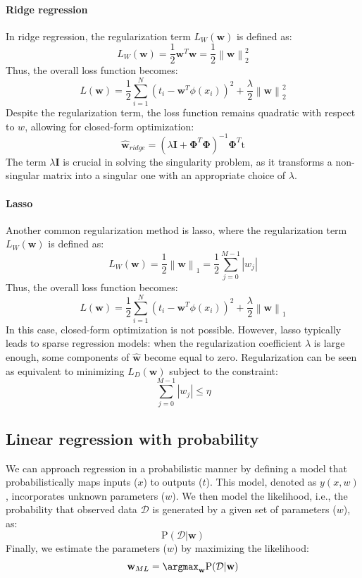 \paragraph*{Ridge regression}
In ridge regression, the regularization term $L_W(\textbf{w})$ is defined as:
\[L_W(\textbf{w})=\dfrac{1}{2}\textbf{w}^T\textbf{w}=\dfrac{1}{2}\left\lVert \textbf{w} \right\rVert_2^2 \]
Thus, the overall loss function becomes:
\[L(\textbf{w})=\dfrac{1}{2}\sum_{i=1}^N {\left( t_i-\textbf{w}^T\phi(x_i) \right)}^2 + \dfrac{\lambda}{2}\left\lVert \textbf{w} \right\rVert_2^2\]
Despite the regularization term, the loss function remains quadratic with respect to $w$, allowing for closed-form optimization:
\[\hat{\textbf{w}}_{ridge}={\left( \lambda\textbf{I}+\boldsymbol{\Phi}^T \boldsymbol{\Phi} \right)}^{-1}\boldsymbol{\Phi}^T\text{t}\]
The term $\lambda\textbf{I}$ is crucial in solving the singularity problem, as it transforms a non-singular matrix into a singular one with an appropriate choice of $\lambda$. 

\paragraph*{Lasso}
Another common regularization method is lasso, where the regularization term $L_W(\textbf{w})$ is defined as:
\[L_W(\textbf{w})=\dfrac{1}{2}\left\lVert \textbf{w} \right\rVert_1=\dfrac{1}{2}\sum_{j=0}^{M-1}\left\lvert w_j \right\rvert\]
Thus, the overall loss function becomes:
\[L(\textbf{w})=\dfrac{1}{2}\sum_{i=1}^N {\left( t_i-\textbf{w}^T\phi(x_i) \right)}^2 + \dfrac{\lambda}{2}\left\lVert \textbf{w} \right\rVert_1\]
In this case, closed-form optimization is not possible. 
However, lasso typically leads to sparse regression models: when the regularization coefficient $\lambda$ is large enough, some components of $\hat{\textbf{w}}$ become equal to zero.
Regularization can be seen as equivalent to minimizing  $L_D(\textbf{w})$ subject to the constraint:
\[\sum_{j=0}^{M-1}\left\lvert w_j \right\rvert \leq \eta\] 

\subsection{Linear regression with probability}
We can approach regression in a probabilistic manner by defining a model that probabilistically maps inputs ($x$) to outputs ($t$).
This model, denoted as $y(x, w)$, incorporates unknown parameters ($w$).
We then model the likelihood, i.e., the probability that observed data $\mathcal{D}$ is generated by a given set of parameters ($w$), as: 
\[\text{P}(\mathcal{D}|\textbf{w})\]
Finally, we estimate the parameters ($w$) by maximizing the likelihood:
\[\textbf{w}_{ML}=\argmax_{\textbf{w}}\text{P}(\mathcal{D}|\textbf{w})\]

